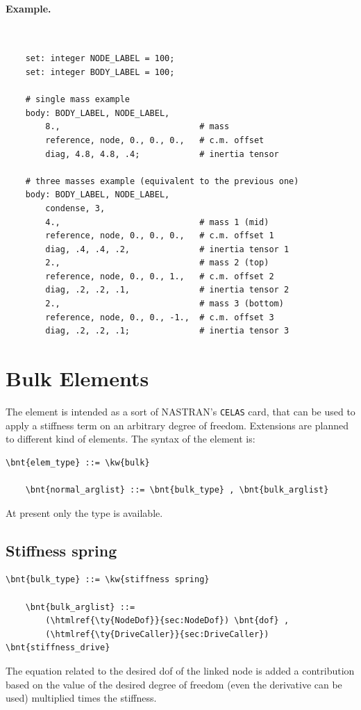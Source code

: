 \paragraph{Example.} \
\begin{verbatim}
    set: integer NODE_LABEL = 100;
    set: integer BODY_LABEL = 100;

    # single mass example
    body: BODY_LABEL, NODE_LABEL,
        8.,                            # mass
        reference, node, 0., 0., 0.,   # c.m. offset
        diag, 4.8, 4.8, .4;            # inertia tensor

    # three masses example (equivalent to the previous one)
    body: BODY_LABEL, NODE_LABEL,
        condense, 3,
        4.,                            # mass 1 (mid)
        reference, node, 0., 0., 0.,   # c.m. offset 1
        diag, .4, .4, .2,              # inertia tensor 1
        2.,                            # mass 2 (top)
        reference, node, 0., 0., 1.,   # c.m. offset 2
        diag, .2, .2, .1,              # inertia tensor 2
        2.,                            # mass 3 (bottom)
        reference, node, 0., 0., -1.,  # c.m. offset 3
        diag, .2, .2, .1;              # inertia tensor 3
\end{verbatim}



\section{Bulk Elements}
The  element is intended as a sort of NASTRAN's \texttt{CELAS} card,
that can be used to apply a stiffness term on an arbitrary degree of freedom.
Extensions are planned to different kind of elements.
The syntax of the  element is:
\begin{Verbatim}[commandchars=\\\{\}]
    \bnt{elem_type} ::= \kw{bulk}

    \bnt{normal_arglist} ::= \bnt{bulk_type} , \bnt{bulk_arglist}
\end{Verbatim}
At present only the  type is available.

\subsection{Stiffness spring}
\begin{Verbatim}[commandchars=\\\{\}]
    \bnt{bulk_type} ::= \kw{stiffness spring}

    \bnt{bulk_arglist} ::=
        (\htmlref{\ty{NodeDof}}{sec:NodeDof}) \bnt{dof} ,
        (\htmlref{\ty{DriveCaller}}{sec:DriveCaller}) \bnt{stiffness_drive}
\end{Verbatim}
The equation related to the desired dof of the linked node is added a
contribution based on the value of the desired degree of freedom (even the
derivative can be used) multiplied times the stiffness.

